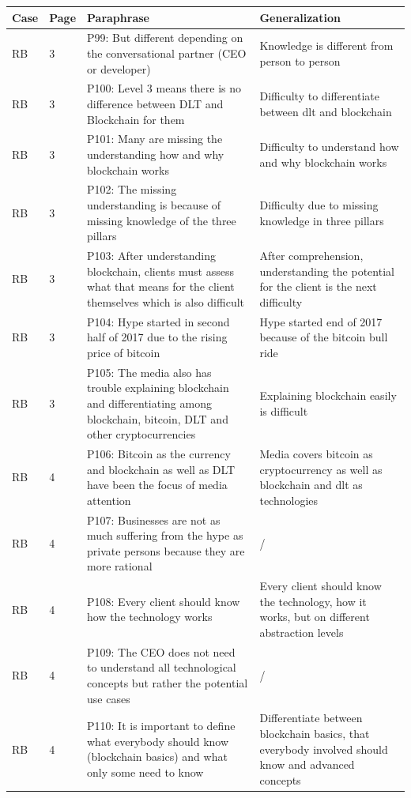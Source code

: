 \begin{table}[H]
    \centering
    \begin{tabularx}{\textwidth}{ll|X|p{4.5cm}}
	Case & Page & Paraphrase & Generalization \\ \hline
	RB & 3 & P99: But different depending on the conversational partner (CEO or developer) & Knowledge is different from person to person   \\  
	RB & 3 & P100: Level 3 means there is no difference between DLT and Blockchain for them & Difficulty to differentiate between dlt and blockchain   \\  
	RB & 3 & P101: Many are missing the understanding how and why blockchain works & Difficulty to understand how and why blockchain works   \\  
	RB & 3 & P102: The missing understanding is because of missing knowledge of the three pillars & Difficulty due to missing knowledge in three pillars   \\  
	RB & 3 & P103: After understanding blockchain, clients must assess what that means for the client themselves which is also difficult & After comprehension, understanding the potential for the client is the next difficulty   \\  
	RB & 3 & P104: Hype started in second half of 2017 due to the rising price of bitcoin & Hype started end of 2017 because of the bitcoin bull ride   \\  
	RB & 3 & P105: The media also has trouble explaining blockchain and differentiating among blockchain, bitcoin, DLT and other cryptocurrencies & Explaining blockchain easily is difficult   \\  
	RB & 4 & P106: Bitcoin as the currency and blockchain as well as  DLT have been the focus of media attention & Media covers bitcoin as cryptocurrency as well as blockchain and dlt as technologies   \\  
	RB & 4 & P107: Businesses are not as much suffering from the hype as private persons because they are more rational & /   \\  
	RB & 4 & P108: Every client should know how the technology works & Every client should know the technology, how it works, but on different abstraction levels   \\  
	RB & 4 & P109: The CEO does not need to understand all technological concepts but rather the potential use cases & /   \\  
	RB & 4 & P110: It is important to define what everybody should know (blockchain basics) and what only some need to know & Differentiate between blockchain basics, that everybody involved should know and advanced concepts   \\  

\end{tabularx}
\end{table}

